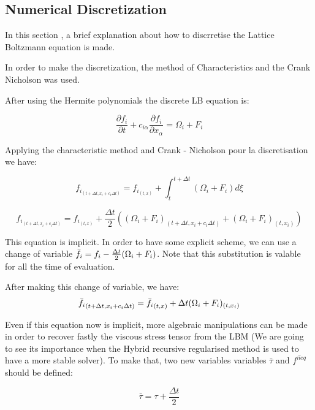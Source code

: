 \subsection{Numerical Discretization}
In this section , a brief explanation about how to discrretise the Lattice
Boltzmann equation is made.

In order to make the discretization, the method of Characteristics and the Crank
Nicholson was used.

After using the Hermite polynomials the discrete LB equation is:

\begin{equation}
    \frac{\partial f_i}{\partial t} + c_{i\alpha}\frac{\partial f_i}{\partial x_\alpha} = \Omega_i +F_i 
\end{equation}

Applying the characteristic method and Crank - Nicholson pour la discretisation we have: 

\begin{equation}
    f_{i_{(t+\Delta t, x_i +c_i \Delta t)}} = f_{i_{(t,x)}} + \int_{t}^{t+\Delta t}(\Omega_i + F_i)d\xi
\end{equation}

\begin{equation*}
    f_{i_{(t+\Delta t, x_i +c_i \Delta t)}} = f_{i_{(t,x)}} + \frac{\Delta t}{2}((\Omega_i +F_i)_{(t+\Delta t, x_i +c_i \Delta t)} + (\Omega_i +F_i)_{(t, x_i)})
\end{equation*}

This equation is implicit. In order to have some explicit scheme, we can use a
change of variable $\Bar{f_i} = f_i - \frac{\Delta t}{2}(\Omega_i + F_i) $. Note
that this substitution is valable for all the time of evaluation.

After making this change of variable, we have:
\begin{equation}
    \Bar{f_i}_{(t+\Delta t, x_i +c_i \Delta t)} = \Bar{f_i}_{(t,x)} + \Delta t(\Omega_i +F_i)_{(t, x_i)}
    \label{explicit equivalent equation}
\end{equation}

Even if this equation now is implicit, more algebraic manipulations can be made
in order to recover fastly the viscous stress tensor from the LBM (We are going
to see its importance when the Hybrid recursive regularised method is used to
have a more stable solver). To make that, two new variables variables
$\bar{\tau}$ and $\bar{f^{neq}}$ should be defined:

\begin{equation}
	\bar{\tau} = \tau + \frac{\Delta t}{2}
\end{equation}

